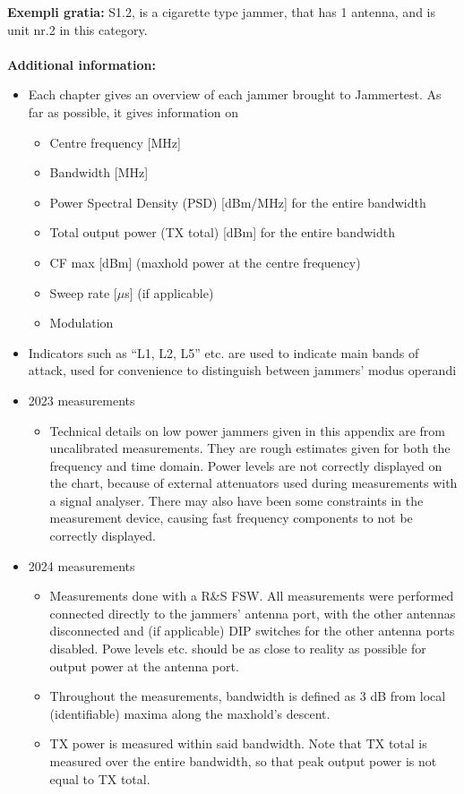 \documentclass[a4paper]{book}
\begin{document}
\textbf{Exempli gratia:}
S1.2, is a cigarette type jammer, that has 1 antenna, and is unit nr.2 in this category.
\\
\\
\textbf{Additional information:}
\begin{itemize}
    \item Each chapter gives an overview of each jammer brought to Jammertest. As far as possible, it
gives information on
    \begin{itemize}
        \item Centre frequency [MHz]
        \item Bandwidth [MHz]
        \item Power Spectral Density (PSD) [dBm/MHz] for the entire bandwidth
        \item Total output power (TX total) [dBm] for the entire bandwidth
        \item CF max [dBm] (maxhold power at the centre frequency)
        \item Sweep rate [$\mu$s] (if applicable)
        \item Modulation
    \end{itemize}
    \item Indicators such as “L1, L2, L5” etc. are used to indicate main bands of attack, used for
convenience to distinguish between jammers' modus operandi
\item 2023 measurements
    \begin{itemize}
        \item Technical details on low power jammers given in this appendix are from uncalibrated
        measurements. They are rough estimates given for both the frequency and time
        domain. Power levels are not correctly displayed on the chart, because of external
        attenuators used during measurements with a signal analyser. There may also have
        been some constraints in the measurement device, causing fast frequency
        components to not be correctly displayed.
    \end{itemize}
    \item 2024 measurements
    \begin{itemize}
        \item Measurements done with a R\&S FSW. All measurements were performed connected
        directly to the jammers' antenna port, with the other antennas disconnected and (if
        applicable) DIP switches for the other antenna ports disabled. Powe levels etc. should
        be as close to reality as possible for output power at the antenna port.
        \item Throughout the measurements, bandwidth is defined as 3 dB from local (identifiable)
        maxima along the maxhold's descent.
        \item TX power is measured within said bandwidth. Note that TX total is measured over the
        entire bandwidth, so that peak output power is not equal to TX total.
    \end{itemize}
\end{itemize}








\end{document}
